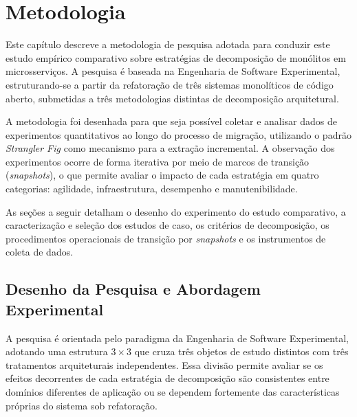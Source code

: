 \chapter{Metodologia}
\label{cap:metodologia}



Este capítulo descreve a metodologia de pesquisa adotada para conduzir este estudo empírico comparativo sobre estratégias de decomposição de monólitos em microsserviços. A pesquisa é baseada na Engenharia de Software Experimental, estruturando-se a partir da refatoração de três sistemas monolíticos de código aberto, submetidas a três metodologias distintas de decomposição arquitetural.

A metodologia foi desenhada para que seja possível coletar e analisar dados de experimentos quantitativos ao longo do processo de migração, utilizando o padrão \textit{Strangler Fig} como mecanismo para a extração incremental. A observação dos experimentos ocorre de forma iterativa por meio de marcos de transição (\textit{snapshots}), o que permite avaliar o impacto de cada estratégia em quatro categorias: agilidade, infraestrutura, desempenho e manutenibilidade.

As seções a seguir detalham o desenho do experimento do estudo comparativo, a caracterização e seleção dos estudos de caso, os critérios de decomposição, os procedimentos operacionais de transição por \textit{snapshots} e os instrumentos de coleta de dados.

\section{Desenho da Pesquisa e Abordagem Experimental}
\label{sec:desenho_pesquisa}

A pesquisa é orientada pelo paradigma da Engenharia de Software Experimental, adotando uma estrutura $3 \times 3$ que cruza três objetos de estudo distintos com três tratamentos arquiteturais independentes. Essa divisão permite avaliar se os efeitos decorrentes de cada estratégia de decomposição são consistentes entre domínios diferentes de aplicação ou se dependem fortemente das características próprias do sistema sob refatoração.


